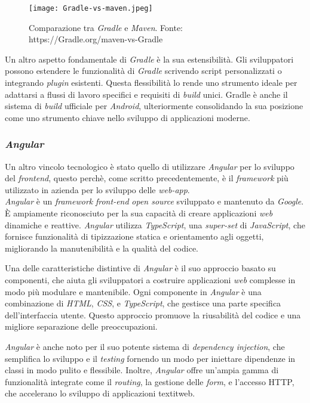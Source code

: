  \begin{figure}[!h] 
  \centering 
  \texttt{[image: Gradle-vs-maven.jpeg]} 
  \caption{Comparazione tra \textit{Gradle} e \textit{Maven}. Fonte: https://Gradle.org/maven-vs-Gradle}
  \label{fig:gredle-vs-maven}
\end{figure}

Un altro aspetto fondamentale di \textit{Gradle} è la sua estensibilità. Gli sviluppatori possono estendere le funzionalità di \textit{Gradle} 
scrivendo script personalizzati o integrando \textit{plugin} esistenti. Questa flessibilità lo rende uno strumento ideale per adattarsi a 
flussi di lavoro specifici e requisiti di \textit{build} unici. Gradle è anche il sistema di \textit{build} ufficiale per \textit{Android}, ulteriormente 
consolidando la sua posizione come uno strumento chiave nello sviluppo di applicazioni moderne.

\subsubsection*{\textit{Angular}}
Un altro vincolo tecnologico è stato quello di utilizzare \textit{Angular} per lo sviluppo del \textit{frontend}, 
questo perchè, come scritto precedentemente, è il \textit{framework} più utilizzato in azienda per lo sviluppo delle \textit{web-app}.\\

\textit{Angular} è un \textit{framework} \textit{front-end} \textit{open source} sviluppato e mantenuto da \textit{Google}. 
È ampiamente riconosciuto per la sua capacità di creare applicazioni \textit{web} dinamiche e reattive. 
\textit{Angular} utilizza \textit{TypeScript}, una \textit{super-set} di \textit{JavaScript}, che fornisce funzionalità di tipizzazione statica e 
orientamento agli oggetti, migliorando la manutenibilità e la qualità del codice.

Una delle caratteristiche distintive di \textit{Angular} è il suo approccio basato su componenti, che aiuta gli sviluppatori a 
costruire applicazioni \textit{web} complesse in modo più modulare e mantenibile. Ogni componente in \textit{Angular} è una combinazione di \textit{HTML}, 
\textit{CSS}, e \textit{TypeScript}, che gestisce una parte specifica dell'interfaccia utente. Questo approccio promuove la riusabilità 
del codice e una migliore separazione delle preoccupazioni.

\textit{Angular} è anche noto per il suo potente sistema di \textit{dependency injection}, che semplifica lo sviluppo e il \textit{testing} fornendo un 
modo per iniettare dipendenze in classi in modo pulito e flessibile. Inoltre, \textit{Angular} offre un'ampia gamma di funzionalità integrate come il 
\textit{routing}, la gestione delle \textit{form}, e l'accesso HTTP, che accelerano lo sviluppo di applicazioni textit{web}.


